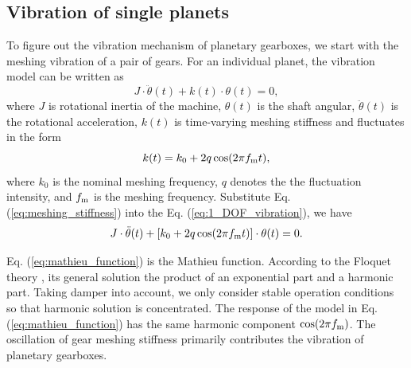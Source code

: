 \documentclass[a4paper,fleqn]{cas-sc}
\begin{document}
\subsection{Vibration of single planets}
\par To figure out the vibration mechanism of planetary gearboxes, we start with the meshing vibration of a pair of gears. For an individual planet, the vibration model can be written as
\begin{equation}
    J \cdot \ddot{\theta}(t) + k(t) \cdot \theta(t) = 0 \label{eq:1_DOF_vibration},
\end{equation}
where \(J\) is rotational inertia of the machine, \(\theta(t)\) is the shaft angular, \(\ddot{\theta}(t)\) is the rotational acceleration, \(k(t)\) is time-varying meshing stiffness and fluctuates in the form
\begin{equation}
    k(t)=k_0+2 q \cos(2 \pi f_{\rm m} t) \label{eq:meshing_stiffness},
\end{equation}
where \(k_0\) is the nominal meshing frequency, \(q\) denotes the the fluctuation intensity, and \(f_{\rm m}\) is the meshing frequency. Substitute Eq. (\ref{eq:meshing_stiffness}) into the Eq. (\ref{eq:1_DOF_vibration}), we have
\begin{equation}
    J \cdot \ddot{\theta}(t) + \left[k_0+2 q \cos(2 \pi f_{\rm m} t)\right] \cdot \theta(t) = 0. \label{eq:mathieu_function}
\end{equation}
\par Eq. (\ref{eq:mathieu_function}) is the Mathieu function. According to the Floquet theory \cite{Arscott2014}, its general solution the product of an exponential part and a harmonic part. Taking damper into account, we only consider stable operation conditions so that harmonic solution is concentrated. The response of the model in Eq. (\ref{eq:mathieu_function}) has the same harmonic component \(\cos(2 \pi f_{\rm m})\). The oscillation of gear meshing stiffness primarily contributes the vibration of planetary gearboxes.
\end{document}
